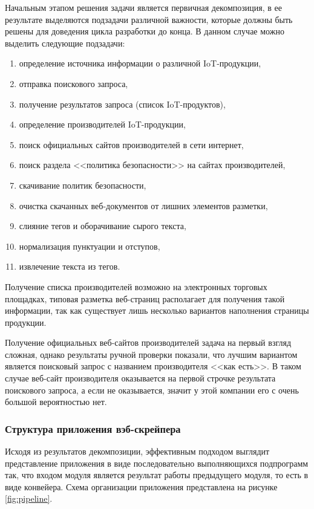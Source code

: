 \documentclass[../main]{subfiles}
\begin{document}
Начальным этапом решения задачи является первичная декомпозиция, в ее результате выделяются подзадачи различной важности, которые должны быть решены для доведения цикла разработки до конца. В данном случае можно выделить следующие подзадачи:
\begin{enumerate}
    \item определение источника информации о различной IoT-продукции,
    \item отправка поискового запроса,
    \item получение результатов запроса (список IoT-продуктов),
    \item определение производителей IoT-продукции,
    \item поиск официальных сайтов производителей в сети интернет,
    \item поиск раздела <<политика безопасности>> на сайтах производителей,
    \item скачивание политик безопасности,
    \item очистка скачанных веб-документов от лишних элементов разметки,
    \item слияние тегов и оборачивание сырого текста,
    \item нормализация пунктуации и отступов,
    \item извлечение текста из тегов.
\end{enumerate}

Получение списка производителей возможно на электронных торговых площадках, типовая разметка веб-страниц располагает для получения такой информации, так как существует лишь несколько вариантов наполнения страницы продукции.

Получение официальных веб-сайтов производителей задача на первый взгляд сложная, однако результаты ручной проверки показали, что лучшим вариантом является поисковый запрос с названием производителя <<как есть>>. В таком случае веб-сайт производителя оказывается на первой строчке результата поискового запроса, а если не оказывается, значит у этой компании его с очень большой вероятностью нет.

\subsubsection{Структура приложения вэб-скрейпера}
Исходя из результатов декомпозиции, эффективным подходом выглядит представление приложения в виде последовательно выполняющихся подпрограмм так, что входом модуля является результат работы предыдуще\-го модуля, то есть в виде конвейера. Схема организации приложения предста\-влена на рисунке \ref{fig:pipeline}.
\end{document}
